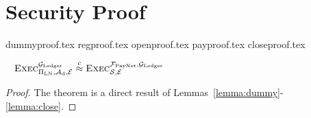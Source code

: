 \section{Security Proof}
  {dummyproof.tex}
  {regproof.tex}
  {openproof.tex}
  {payproof.tex}
  {closeproof.tex}

  \begin{theorem} \
    \label{theorem:simulation}
    $\textsc{Exec}^{\mathcal{G}_{\mathrm{Ledger}}}_{\Pi_{\mathrm{LN}}, \mathcal{A}_{\mathrm{d}},
    \mathcal{E}} \overset{c}{\approx} \textsc{Exec}^{\mathcal{F}_{\mathrm{PayNet}},
    \mathcal{G}_{\mathrm{Ledger}}}_{\mathcal{S}, \mathcal{E}}$
  \end{theorem}

  \begin{proof}
    The theorem is a direct result of
    Lemmas~\ref{lemma:dummy}-\ref{lemma:close}.
  \end{proof}
